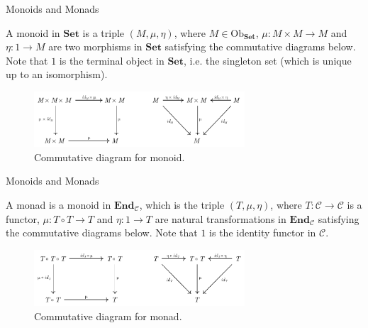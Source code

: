\documentclass[aspectratio=169,xcolor=dvipsnames,10pt]{beamer}
\theoremstyle{definition}
\begin{document}
\begin{frame}[fragile]{Monoids and Monads}
	\begin{definition}
		A monoid in $\mathbf{Set}$ is a triple $(M, \mu, \eta)$, where $M \in \text{Ob}_\mathbf{Set}$,
		$\mu:M \times M \to M$ and $\eta: 1 \to M$ are two morphisms in $\mathbf{Set}$ satisfying the
		commutative diagrams below. Note that $1$ is the terminal object in $\mathbf{Set}$, i.e.
		the singleton set (which is unique up to an isomorphism).

		\begin{figure}[H]
			\begin{center}
				\includegraphics[width=0.7\textwidth]{./figs/MonoidalCategory.pdf}
			\end{center}
			\caption{Commutative diagram for monoid.}
			\label{fig:monoid-diagram}
		\end{figure}
		\label{def:monoid-cat}
	\end{definition}
\end{frame}

\begin{frame}[fragile]{Monoids and Monads}
	\begin{definition}[Monad]
		A monad is a monoid in $\mathbf{End}_\mathcal C$, which is the triple $(T, \mu, \eta)$,
		where $T:\mathcal C \to \mathcal C$ is a functor,
		$\mu:T \circ T \to T$ and $\eta: 1 \to T$ are natural transformations in $\mathbf{End}_\mathcal C$ satisfying the
		commutative diagrams below. Note that $1$ is the identity functor in $\mathcal{C}$.
		\begin{figure}[H]
			\begin{center}
				\includegraphics[width=0.7\textwidth]{../notebooks/Monad.pdf}
			\end{center}
			\caption{Commutative diagram for monad.}
			\label{fig:monad}
		\end{figure}
	\end{definition}
\end{frame}
\end{document}
